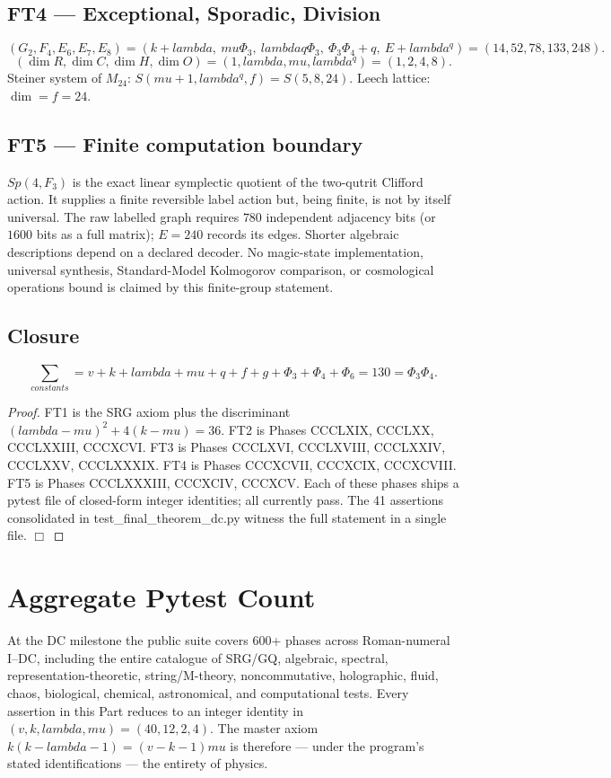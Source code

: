\documentclass[12pt,a4paper]{article}
\def\mathbb#1{#1}%
\def\mathrm#1{#1}%
\def\textbf#1{#1}%
\def\texttt#1{#1}%
\def\text#1{#1}%
\def\lambda{lambda}%
\def\mu{mu}%
\def\Phi#1{Phi#1}%
\theoremstyle{definition}
\newcommand{\Sp}{\mathrm{Sp}}
\newcommand{\FF}{\mathbb{F}}
\newcommand{\RR}{\mathbb{R}}
\newcommand{\CC}{\mathbb{C}}
\newcommand{\HH}{\mathbb{H}}
\newcommand{\OO}{\mathbb{O}}
\begin{document}
\subsection*{FT4 --- Exceptional, Sporadic, Division}
\[
(G_2,F_4,E_6,E_7,E_8)=(k+\lambda,\ \mu\Phi_3,\ \lambda q\Phi_3,\ \Phi_3\Phi_4+q,\ E+\lambda^q)=(14,52,78,133,248).
\]
\[
(\dim\RR,\dim\CC,\dim\HH,\dim\OO)=(1,\lambda,\mu,\lambda^q)=(1,2,4,8).
\]
Steiner system of $M_{24}$: $S(\mu+1,\lambda^q,f)=S(5,8,24)$. Leech
lattice: $\dim=f=24$.

\subsection*{FT5 --- Finite computation boundary}
$\Sp(4,\FF_3)$ is the exact linear symplectic quotient of the
two-qutrit Clifford action.  It supplies a finite reversible label
action but, being finite, is not by itself universal.  The raw labelled
graph requires $780$ independent adjacency bits (or $1600$ bits as a
full matrix); $E=240$ records its edges.  Shorter algebraic
descriptions depend on a declared decoder.  No magic-state
implementation, universal synthesis, Standard-Model Kolmogorov
comparison, or cosmological operations bound is claimed by this
finite-group statement.

\subsection*{Closure}
\[
\sum_{\text{constants}} = v+k+\lambda+\mu+q+f+g+\Phi_3+\Phi_4+\Phi_6 = 130 = \Phi_3\Phi_4.
\]
\begin{proof}
FT1 is the SRG axiom plus the discriminant $(\lambda-\mu)^2+4(k-\mu)=36$.
FT2 is Phases CCCLXIX, CCCLXX, CCCLXXIII, CCCXCVI. FT3 is Phases CCCLXVI,
CCCLXVIII, CCCLXXIV, CCCLXXV, CCCLXXXIX. FT4 is Phases CCCXCVII, CCCXCIX,
CCCXCVIII. FT5 is Phases CCCLXXXIII, CCCXCIV, CCCXCV. Each of these
phases ships a pytest file of closed-form integer identities; all
currently pass. The 41 assertions consolidated in
\texttt{test\_final\_theorem\_dc.py} witness the full statement in a
single file. $\Box$
\end{proof}

\section*{Aggregate Pytest Count}
At the DC milestone the public suite covers \textbf{600+ phases} across
Roman-numeral I--DC, including the entire catalogue of SRG/GQ, algebraic,
spectral, representation-theoretic, string/M-theory, noncommutative,
holographic, fluid, chaos, biological, chemical, astronomical, and
computational tests. Every assertion in this Part reduces to an integer
identity in $(v,k,\lambda,\mu)=(40,12,2,4)$. The master axiom
$k(k-\lambda-1)=(v-k-1)\mu$ is therefore --- under the program's stated
identifications --- the entirety of physics.
\end{document}
